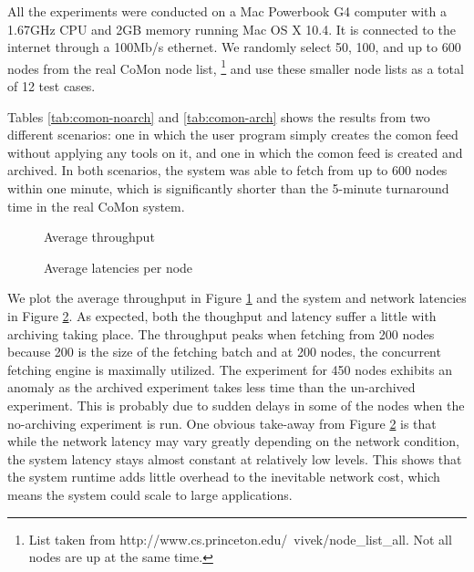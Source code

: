 All the experiments were conducted on a Mac Powerbook G4 computer
with a 1.67GHz CPU and 2GB memory running Mac OS X 10.4. It is
connected to the internet through a 100Mb/s ethernet. 
We randomly select 50, 100, and up to 600 nodes from the 
real CoMon node list, 
\footnote{List taken from http://www.cs.princeton.edu/~vivek/node\_list\_all. 
Not all nodes are up at the same time.}
and use these smaller node lists as a total of 12 test cases. 

Tables \ref{tab:comon-noarch} and \ref{tab:comon-arch}
shows the results from two different scenarios:
one in which the user program simply creates the comon feed without applying
any tools on it, and one in which the comon feed is created
and archived. In both scenarios, the system was
able to fetch from up to 600 nodes within one minute, which is
significantly shorter than the 5-minute turnaround time in the real
CoMon system.

\begin{figure}[th]
\begin{center}
\caption{Average throughput}
\label{fig:throughput}
\end{center}
\end{figure}

\begin{figure}[th]
\begin{center}
\caption{Average latencies per node}
\label{fig:latency}
\end{center}
\end{figure}

We plot the average throughput in Figure \ref{fig:throughput}
and the system and network latencies in Figure \ref{fig:latency}. 
As expected, both the thoughput and latency suffer a little with 
archiving taking place. The throughput peaks when fetching from
200 nodes because 200 is the size of the fetching batch and
at 200 nodes, the concurrent fetching engine is maximally utilized.
The experiment for 450 nodes exhibits an anomaly as the archived
experiment takes less time than the un-archived experiment.
This is probably due to sudden delays in some of the nodes when the
no-archiving experiment is run. One obvious take-away from
Figure \ref{fig:latency} is that while the network latency may
vary greatly depending on the network condition, the system latency
stays almost constant at relatively low levels. This shows that
the \padsd{} system runtime adds little overhead to the 
inevitable network cost, which means the system could scale to
large applications. 

